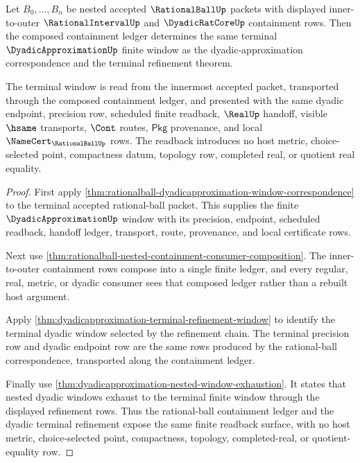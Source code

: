 \begin{theorem}
\label{thm:rationalball-dyadicapproximation-nested-window-readback}
Let $B_0,\ldots,B_n$ be nested accepted $\RationalBallUp$ packets with
displayed inner-to-outer $\RationalIntervalUp$ and $\DyadicRatCoreUp$
containment rows. Then the composed containment ledger determines the same
terminal $\DyadicApproximationUp$ finite window as the dyadic-approximation
correspondence and the terminal refinement theorem.

The terminal window is read from the innermost accepted packet, transported
through the composed containment ledger, and presented with the same dyadic
endpoint, precision row, scheduled finite readback, $\RealUp$ handoff, visible
$\hsame$ transports, $\Cont$ routes, $\mathsf{Pkg}$ provenance, and local
$\NameCert_{\RationalBallUp}$ rows. The readback introduces no host metric,
choice-selected point, compactness datum, topology row, completed real, or
quotient real equality.
\end{theorem}
\begin{proof}
First apply
\autoref{thm:rationalball-dyadicapproximation-window-correspondence} to the
terminal accepted rational-ball packet. This supplies the finite
$\DyadicApproximationUp$ window with its precision, endpoint, scheduled
readback, handoff ledger, transport, route, provenance, and local certificate
rows.

Next use
\autoref{thm:rationalball-nested-containment-consumer-composition}. The
inner-to-outer containment rows compose into a single finite ledger, and every
regular, real, metric, or dyadic consumer sees that composed ledger rather than
a rebuilt host argument.

Apply \autoref{thm:dyadicapproximation-terminal-refinement-window} to identify
the terminal dyadic window selected by the refinement chain. The terminal
precision row and dyadic endpoint row are the same rows produced by the
rational-ball correspondence, transported along the containment ledger.

Finally use \autoref{thm:dyadicapproximation-nested-window-exhaustion}. It
states that nested dyadic windows exhaust to the terminal finite window through
the displayed refinement rows. Thus the rational-ball containment ledger and
the dyadic terminal refinement expose the same finite readback surface, with no
host metric, choice-selected point, compactness, topology, completed-real, or
quotient-equality row.
\end{proof}

